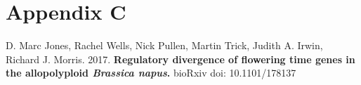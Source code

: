 \documentclass[12pt,]{book}
\begin{document}
\chapter*{Appendix C}\label{chapter:appendixc}

D. Marc Jones, Rachel Wells, Nick Pullen, Martin Trick, Judith A. Irwin,
Richard J. Morris. 2017. \textbf{Regulatory divergence of flowering time
genes in the allopolyploid \emph{Brassica napus}.} bioRxiv doi:
10.1101/178137
\end{document}
